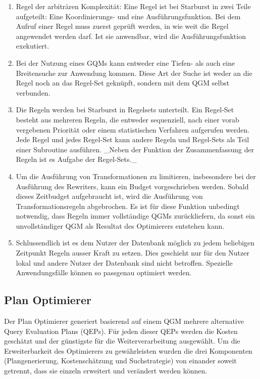 \begin{enumerate}
\item Regel der arbiträren Komplexität: Eine Regel ist bei Starburst in zwei Teile aufgeteilt: Eine Koordinierungs- und eine Ausführungsfunktion. Bei dem Aufruf einer Regel muss zuerst geprüft werden, in wie weit die Regel angewendet werden darf. Ist sie anwendbar, wird die Ausführungsfunktion exekutiert.

\item Bei der Nutzung eines GQMs kann entweder eine Tiefen- als auch eine Breitensuche zur Anwendung kommen. Diese Art der Suche ist weder an die Regel noch an das Regel-Set geknüpft, sondern mit dem QGM selbst verbunden.


\item Die Regeln werden bei Starburst in Regelsets unterteilt. Ein Regel-Set besteht aus mehreren Regeln, die entweder sequenziell, nach einer vorab vergebenen Priorität oder einem statistischen Verfahren aufgerufen werden. Jede Regel und jedes Regel-Set kann andere Regeln und Regel-Sets als Teil einer Subroutine ausführen. _Neben der Funktion der Zusammenfassung der Regeln ist es Aufgabe der Regel-Sets._

\item Um die Ausführung von Transformationen zu limitieren, insbesondere bei der Ausführung des Rewriters, kann ein Budget vorgeschrieben werden. Sobald dieses Zeitbudget aufgebraucht ist, wird die Ausführung von Transformationsregeln abgebrochen. Es ist für diese Funktion unbedingt notwendig, dass Regeln immer vollständige QGMs zurückliefern, da sonst ein unvollständiger QGM als Resultat des Optimierers entstehen kann.

\item Schlussendlich ist es dem Nutzer der Datenbank möglich zu jedem beliebigen Zeitpunkt Regeln ausser Kraft zu setzen. Dies geschieht nur für den Nutzer lokal und andere Nutzer der Datenbank sind nicht betroffen. Spezielle Anwendungsfälle können so passgenau optimiert werden.
\end{enumerate}

\subsection{Plan Optimierer}

Der Plan Optimierer generiert basierend auf einem QGM mehrere alternative Query Evaluation Plans (QEPs). Für jeden dieser QEPs werden die Kosten geschätzt und der günstigste für die Weiterverarbeitung ausgewählt. Um die Erweiterbarkeit des Optimierers zu gewährleisten wurden die drei Komponenten (Plangenerierung, Kostenschätzung und Suchstrategie) von einander soweit getrennt, dass sie einzeln erweitert und verändert werden können. 

